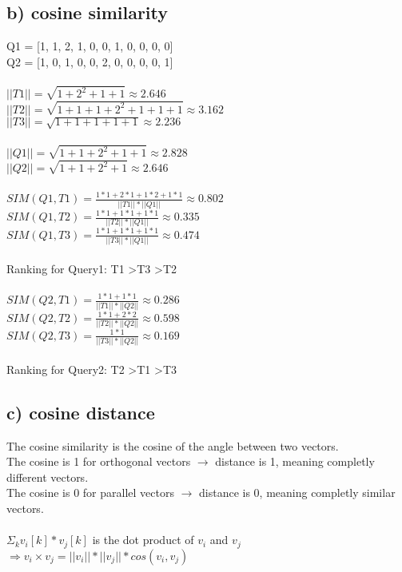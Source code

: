 \documentclass{article}
\begin{document}
\subsection*{b) cosine similarity }
Q1 = [1, 1, 2, 1, 0, 0, 1, 0, 0, 0, 0]\\
Q2 = [1, 0, 1, 0, 0, 2, 0, 0, 0, 0, 1]\\
\\
$ || T1 || = \sqrt{1 +2^2 + 1 +1} \approx 2.646$\\
$ || T2 || = \sqrt{1 + 1 + 1 + 2^2 + 1 + 1 + 1} \approx 3.162$\\
$ || T3 || = \sqrt{1 + 1 + 1 + 1 + 1} \approx 2.236$\\
\\
$ || Q1 || = \sqrt{1 + 1 + 2^2 + 1 + 1} \approx 2.828$\\
$ || Q2 || = \sqrt{1 + 1 + 2^2 + 1} \approx 2.646$\\
\vspace{0.5cm}
\\
$SIM(Q1, T1) = \frac{1*1 + 2*1 + 1*2 + 1*1}{|| T1 || * || Q1 ||} \approx
0.802$\\
$SIM(Q1, T2) = \frac{1*1 + 1*1 + 1*1}{|| T2 || * || Q1 ||} \approx 0.335 $\\
$SIM(Q1, T3) = \frac{1*1 + 1*1 + 1*1}{|| T3 || * || Q1 ||} \approx 0.474 $\\
\\
Ranking for Query1: T1 \textgreater T3 \textgreater T2\\
\\
$SIM(Q2, T1) = \frac{1*1 + 1*1}{|| T1 || * || Q2 ||} \approx 0.286 $\\
$SIM(Q2, T2) = \frac{1*1 + 2*2}{|| T2 || * || Q2 ||} \approx 0.598 $\\
$SIM(Q2, T3) = \frac{1*1}{|| T3 || * || Q2 ||} \approx 0.169 $\\
\\
Ranking for Query2: T2 \textgreater T1 \textgreater T3\\

\subsection*{c) cosine distance}
The cosine similarity is the cosine of the angle between two vectors.\\
The cosine is 1 for orthogonal vectors $\rightarrow$ distance is 1, meaning
completly different vectors.\\
The cosine is 0 for parallel vectors $\rightarrow$ distance is 0, meaning
completly similar vectors.\\
\\
$ \Sigma{_k} v_i[k] * v_j[k] $ is the dot product of $v_i$ and $v_j$
$\Rightarrow v_i \times v_j = ||v_i|| * ||v_j|| * cos(v_i,v_j) $
\end{document}
